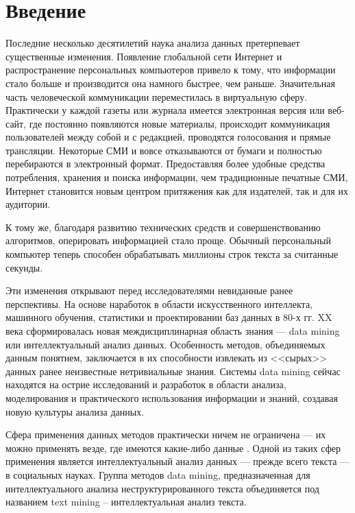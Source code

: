 \chapter*{Введение}							%

Последние несколько десятилетий наука анализа данных претерпевает существенные изменения. Появление глобальной сети Интернет и распространение персональных компьютеров привело к тому, что информации стало больше и производится она намного быстрее, чем раньше. Значительная часть человеческой коммуникации переместилась в виртуальную сферу. Практически у каждой газеты или журнала имеется электронная версия или веб-сайт, где постоянно появляются новые материалы, происходит коммуникация пользователей между собой и с редакцией, проводятся голосования и прямые трансляции. Некоторые СМИ и вовсе отказываются от бумаги и полностью перебираются в электронный формат. Предоставляя более удобные средства потребления, хранения и поиска информации, чем традиционные печатные СМИ, Интернет становится новым центром притяжения как для издателей, так и для их аудитории.

К тому же, благодаря развитию технических средств и совершенствованию алгоритмов, оперировать информацией стало проще. Обычный персональный компьютер теперь способен обрабатывать миллионы строк текста за считанные секунды.

Эти изменения открывают перед исследователями невиданные ранее перспективы. На основе наработок в области искусственного интеллекта, машинного обучения, статистики и проектировании баз данных в 80-х гг. XX века сформировалась новая междисциплинарная область знания --- data mining или интеллектуальный анализ данных. Особенность методов, объединяемых данным понятием, заключается в их способности извлекать из <<сырых>> данных ранее неизвестные нетривиальные знания. Системы data mining сейчас находятся на острие исследований и разработок в области анализа, моделирования и практического использования информации и знаний, создавая новую культуры анализа данных.

Сфера применения данных методов практически ничем не ограничена --- их можно применять везде, где имеются какие-либо данные \cite[стр. 81]{Duk2011}. Одной из таких сфер применения является интеллектуальный анализ данных --- прежде всего текста --- в социальных науках. Группа методов data mining, предназначенная для интеллектуального анализа неструктурированного текста объединяется под названием text mining -- интеллектуальная анализ текста.

